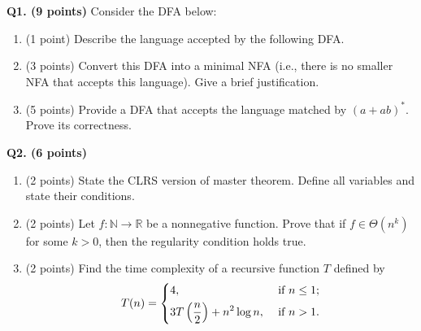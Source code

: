 \documentclass{article}
\begin{document}
    \textbf{Q1. (9 points)}
    \smallskip
    Consider the DFA below:
    \begin{center}
    \end{center}
    \begin{enumerate}[label=\alph*)]
        \item (1 point) Describe the language accepted by the following DFA.

        \item (3 points) Convert this DFA into a minimal NFA (i.e., there is no smaller NFA that accepts this language). Give a brief justification.
        
        \newpage

        \item  (5 points) Provide a DFA that accepts the language matched by \((a+ab)^*\). Prove its correctness.
    \end{enumerate}

    \newpage

    \textbf{Q2. (6 points)}
    \begin{enumerate}[label=\alph*)]
        \item (2 points) State the CLRS version of master theorem. Define all variables and state their conditions.
        \vfill
        \item (2 points) Let \(f: \mathbb{N} \to \mathbb{R}\) be a nonnegative function. Prove that if \(f \in \Theta (n^k)\) for some \(k > 0\), then the regularity condition holds true.
        \vfill
        \item (2 points) Find the time complexity of a recursive function \(T\) defined by
        \[
            T(n) = \begin{dcases}
                4, &\text{ if }  n \leq 1;\\
                3T\left(\frac{n}{2}\right) + n^{2} \log n, &\text{ if } n > 1.
            \end{dcases}
        \]
        \vfill
    \end{enumerate}
\end{document}
